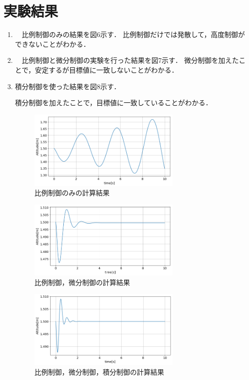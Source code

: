 \documentclass[twocolumn,11pt]{abst}
\begin{document}
\section{実験結果}
\begin{enumerate}
  \item　比例制御のみの結果を図6示す．
比例制御だけでは発散して，高度制御ができないことがわかる．
  \item　比例制御と微分制御の実験を行った結果を図7示す．
微分制御を加えたことで，安定するが目標値に一致しないことがわかる．
  \item 積分制御を使った結果を図8示す．


積分制御を加えたことで，目標値に一致していることがわかる．

\begin{figure}[htbp]
  \begin{center}
   \includegraphics[width=75mm]{img/発散.jpg}
    \end{center}
  \caption{比例制御のみの計算結果}
 \label{fig:ensyu3tex}
\end{figure}

\begin{figure}[htbp]
  \begin{center}
   \includegraphics[width=75mm]{img/PD.jpg}
    \end{center}
  \caption{比例制御，微分制御の計算結果}
 \label{fig:ensyu3tex}
\end{figure}

\begin{figure}[htbp]
  \begin{center}
   \includegraphics[width=75mm]{img/PIDbest.jpg}
    \end{center}
  \caption{比例制御，微分制御，積分制御の計算結果}
 \label{fig:ensyu3tex}
\end{figure}



\end{enumerate}
\end{document}
